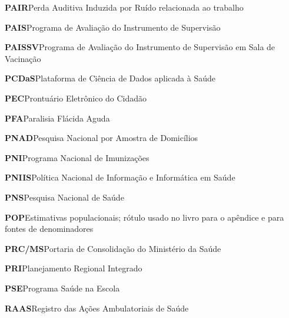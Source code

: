 \noindent\textbf{PAIR}\hspace{1em}Perda Auditiva Induzida por Ruído relacionada ao trabalho\par\smallskip
\noindent\textbf{PAIS}\hspace{1em}Programa de Avaliação do Instrumento de Supervisão\par\smallskip
\noindent\textbf{PAISSV}\hspace{1em}Programa de Avaliação do Instrumento de Supervisão em Sala de Vacinação\par\smallskip
\noindent\textbf{PCDaS}\hspace{1em}Plataforma de Ciência de Dados aplicada à Saúde\par\smallskip
\noindent\textbf{PEC}\hspace{1em}Prontuário Eletrônico do Cidadão\par\smallskip
\noindent\textbf{PFA}\hspace{1em}Paralisia Flácida Aguda\par\smallskip
\noindent\textbf{PNAD}\hspace{1em}Pesquisa Nacional por Amostra de Domicílios\par\smallskip
\noindent\textbf{PNI}\hspace{1em}Programa Nacional de Imunizações\par\smallskip
\noindent\textbf{PNIIS}\hspace{1em}Política Nacional de Informação e Informática em Saúde\par\smallskip
\noindent\textbf{PNS}\hspace{1em}Pesquisa Nacional de Saúde\par\smallskip
\noindent\textbf{POP}\hspace{1em}Estimativas populacionais; rótulo usado no livro para o apêndice e para fontes de denominadores\par\smallskip
\noindent\textbf{PRC/MS}\hspace{1em}Portaria de Consolidação do Ministério da Saúde\par\smallskip
\noindent\textbf{PRI}\hspace{1em}Planejamento Regional Integrado\par\smallskip
\noindent\textbf{PSE}\hspace{1em}Programa Saúde na Escola\par\smallskip
\noindent\textbf{RAAS}\hspace{1em}Registro das Ações Ambulatoriais de Saúde\par\smallskip

